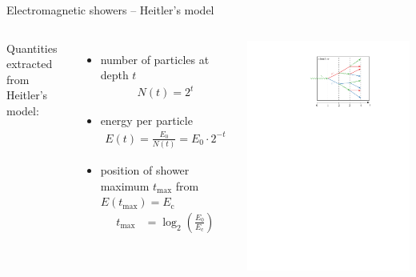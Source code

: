 \documentclass[11pt,xcolor=dvipsnames,professionalfonts]{beamer}
\begin{document}
\begin{frame}{Electromagnetic showers -- Heitler's model}
	\begin{columns}
		Quantities extracted from Heitler's model:
		\begin{itemize}
			\setlength\itemsep{1.em}
			\item number of particles at depth $t$
			\begin{align*}
				N(t) = 2^t
			\end{align*}
			
			\item energy per particle
			\begin{align*}
				E(t) = \frac{E_0}{N(t)} = E_0 \cdot 2^{-t}
			\end{align*}
			
			\item position of shower maximum $t_\mathrm{max}$ from $E(t_\mathrm{max}) = E_\mathrm{c}$
			\begin{align*}
				t_\mathrm{max} &= \log_2\left(\frac{E_0}{E_\mathrm{c}}\right)
			\end{align*}
		\end{itemize}
		
		\begin{center}
			\includegraphics[width=1.0\textwidth]{./figures/shower_cascadeunits.pdf}
		\end{center}
	\end{columns}
\end{frame}
\end{document}
